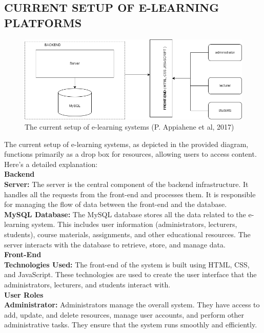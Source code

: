 \documentclass[a4paper,12pt]{article}  %
\begin{document}
\subsection{CURRENT SETUP OF E-LEARNING PLATFORMS}
\begin{figure}[H]
      \centering
      \includegraphics[width=1\textwidth]{figures/current.png}
      \caption{The current setup of e-learning systems (P. Appiahene et al, 2017)\cite{appiahene2017design}}
\end{figure}
The current setup of e-learning systems, as depicted in the provided diagram,
functions primarily as a drop box for resources, allowing users to access
content. Here's a detailed explanation:\\
\large\textbf{Backend}\\
\textbf{Server:} The server is the central component of the backend infrastructure. It
handles all the requests from the front-end and processes them. It is
responsible for managing the flow of data between the front-end and the
database.\\

\textbf{MySQL Database:} The MySQL database stores all the data related to the
e-learning system. This includes user information (administrators, lecturers,
students), course materials, assignments, and other educational resources. The
server interacts with the database to retrieve, store, and manage data.\\

\large\textbf{Front-End}\\
\textbf{Technologies Used:} The front-end of the system is built using HTML, CSS, and
JavaScript. These technologies are used to create the user interface that the
administrators, lecturers, and students interact with.\\

\large\textbf{User Roles}\\
\textbf{Administrator:} Administrators manage the overall system. They have access to
add, update, and delete resources, manage user accounts, and perform other
administrative tasks. They ensure that the system runs smoothly and
efficiently.\\
\end{document}

